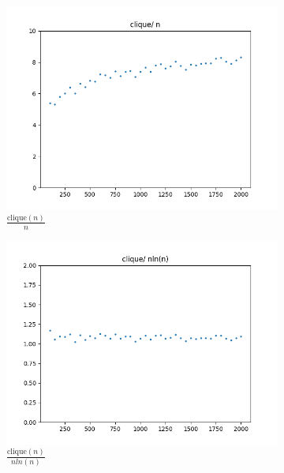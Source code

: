 \documentclass{article}
\begin{document}
\begin{figure}[H]
  \centering
  \begin{subfigure}{.475\textwidth}
    \centering
    \includegraphics[width=\textwidth]{clique_n.png}
    \caption{\( \frac{\text{clique}(n)}{n} \)}
    \label{fig:clique_n}
  \end{subfigure}%
  \begin{subfigure}{.475\textwidth}
    \centering
    \includegraphics[width=\textwidth]{clique_nlnn.png}
    \caption{\( \frac{\text{clique}(n)}{nln(n)} \)}
    \label{fig:clique_nlnn}
  \end{subfigure}%
  \hfill
  \begin{subfigure}{.475\textwidth}
    \centering

\end{subfigure}
\end{figure}
\end{document}
